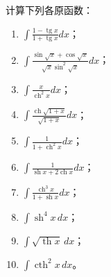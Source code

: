 \begin{exercise}
	\item 计算下列各原函数：
	\begin{enumerate}[label=\arabic*)]
		\item \(\displaystyle\int\frac{1-\operatorname{tg}x}{1+\operatorname{tg}x}dx\)；
		\item \(\displaystyle\int\frac{\sin\sqrt{x}+\cos\sqrt{x}}{\sqrt{x}\sin^2\sqrt{x}}dx\)；
		\item \(\displaystyle\int\frac{x}{\operatorname{ch}^2x}dx\)；
		\item \(\displaystyle\int\frac{\operatorname{ch}\sqrt{1+x}}{\sqrt{1+x}}dx\)；
		\item \(\displaystyle\int\frac1{1+\operatorname{ch}^2x}dx\)；
		\item \(\displaystyle\int\frac1{\operatorname{sh}x+2\operatorname{ch}x}dx\)；
		\item \(\displaystyle\int\frac{\operatorname{ch}^3x}{1+\operatorname{sh}x}dx\)；
		\item \(\displaystyle\int\operatorname{sh}^4x\,dx\)；
		\item \(\displaystyle\int\sqrt{\operatorname{th}x}\,dx\)；
		\item \(\displaystyle\int\operatorname{cth}^2x\,dx\)。
	\end{enumerate}
\end{exercise}

